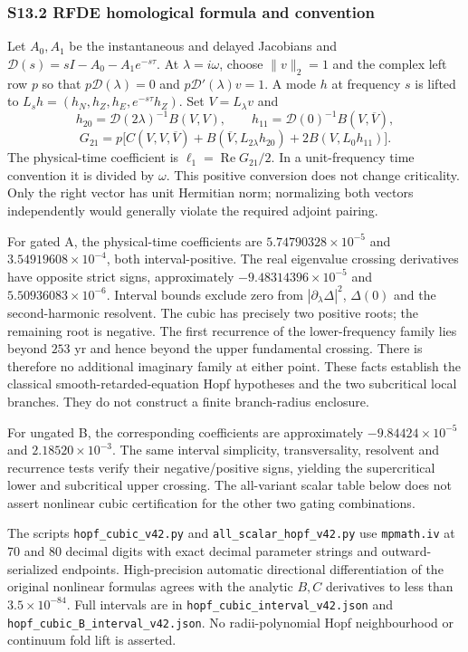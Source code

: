 \documentclass[
  10pt,
  a4paper,
]{article}
\begin{document}
\subsubsection{S13.2 RFDE homological formula and
convention}\label{s13.2-rfde-homological-formula-and-convention}

Let \(A_0,A_1\) be the instantaneous and delayed Jacobians and
\(\mathcal D(s)=sI-A_0-A_1e^{-s\tau}\). At \(\lambda=i\omega\), choose
\(\|v\|_2=1\) and the complex left row \(p\) so that
\(p\mathcal D(\lambda)=0\) and \(p\mathcal D'(\lambda)v=1\). A mode
\(h\) at frequency \(s\) is lifted to
\(L_s h=(h_N,h_Z,h_E,e^{-s\tau}h_Z)\). Set \(V=L_\lambda v\) and
\[h_{20}=\mathcal D(2\lambda)^{-1}B(V,V),\qquad h_{11}=\mathcal D(0)^{-1}B(V,\overline V),\]
\[G_{21}=p\big[C(V,V,\overline V)+B(\overline V,L_{2\lambda}h_{20})+2B(V,L_0h_{11})\big].\]
The physical-time coefficient is \(\ell_1=\operatorname{Re}G_{21}/2\).
In a unit-frequency time convention it is divided by \(\omega\). This
positive conversion does not change criticality. Only the right vector
has unit Hermitian norm; normalizing both vectors independently would
generally violate the required adjoint pairing.

For gated A, the physical-time coefficients are
\(5.74790328\times10^{-5}\) and \(3.54919608\times10^{-4}\), both
interval-positive. The real eigenvalue crossing derivatives have
opposite strict signs, approximately \(-9.48314396\times10^{-5}\) and
\(5.50936083\times10^{-6}\). Interval bounds exclude zero from
\(|\partial_\lambda\Delta|^2\), \(\Delta(0)\) and the second-harmonic
resolvent. The cubic has precisely two positive roots; the remaining
root is negative. The first recurrence of the lower-frequency family
lies beyond \(253\) yr and hence beyond the upper fundamental crossing.
There is therefore no additional imaginary family at either point. These
facts establish the classical smooth-retarded-equation Hopf hypotheses
and the two subcritical local branches. They do not construct a finite
branch-radius enclosure.

For ungated B, the corresponding coefficients are approximately
\(-9.84424\times10^{-5}\) and \(2.18520\times10^{-3}\). The same
interval simplicity, transversality, resolvent and recurrence tests
verify their negative/positive signs, yielding the supercritical lower
and subcritical upper crossing. The all-variant scalar table below does
not assert nonlinear cubic certification for the other two gating
combinations.

The scripts \texttt{hopf\_cubic\_v42.py} and
\texttt{all\_scalar\_hopf\_v42.py} use \texttt{mpmath.iv} at 70 and 80
decimal digits with exact decimal parameter strings and
outward-serialized endpoints. High-precision automatic directional
differentiation of the original nonlinear formulas agrees with the
analytic \(B,C\) derivatives to less than \(3.5\times10^{-84}\). Full
intervals are in \texttt{hopf\_cubic\_interval\_v42.json} and
\texttt{hopf\_cubic\_B\_interval\_v42.json}. No radii-polynomial Hopf
neighbourhood or continuum fold lift is asserted.
\end{document}
